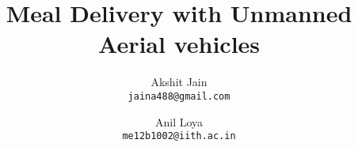 \documentclass[11pt]{article}
\begin{document}
\title{Meal Delivery with Unmanned Aerial vehicles}
\author{Akshit Jain\\
\texttt{jaina488@gmail.com}
\and
Anil Loya\\
\texttt{me12b1002@iith.ac.in}
}


\maketitle



\newpage
\tableofcontents
\newpage











\end{document}
